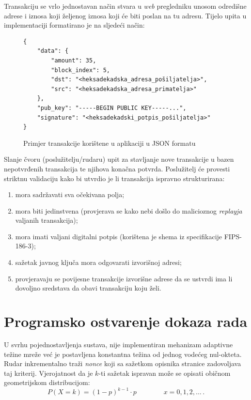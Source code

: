 \documentclass[utf8, zavrsni]{fer}
\begin{document}
Transakciju se vrlo jednostavan način stvara u \textit{web} pregledniku unosom odredišne adrese i iznosa koji željenog iznosa koji će biti poslan na tu adresu. Tijelo upita u implementaciji formatirano je na sljedeći način:
\begin{figure}[H]
\begin{verbatim}
{
	"data": {
		"amount": 35,
		"block_index": 5,
		"dst": "<heksadekadska_adresa_pošiljatelja>",
		"src": "<heksadekadska_adresa_primatelja>"
	},
	"pub_key": "-----BEGIN PUBLIC KEY-----...",
	"signature": "<heksadekadski_potpis_pošiljatelja>"
}
\end{verbatim}
\caption{Primjer transakcije korištene u aplikaciji u JSON formatu}
    \label{fig:img_txn}
\end{figure}

Slanje čvoru (poslužitelju/rudaru) upit za stavljanje nove transakcije u bazen nepotvrđenih transakcija te njihova konačna potvrda. Poslužitelj će provesti striktnu validaciju kako bi utvrdio je li transakcija ispravno strukturirana:

\begin{enumerate}
	\item mora sadržavati sva očekivana polja;
	\item mora biti jedinstvena (provjerava se kako nebi došlo do malicioznog \textit{replayja} valjanih transakcija);
	\item mora imati valjani digitalni potpis (korištena je shema iz specifikacije FIPS-186-3);
	\item sažetak javnog ključa mora odgovarati izvorišnoj adresi;
	\item provjeravaju se povijesne transakcije izvorišne adrese da se ustvrdi ima li dovoljno sredstava da obavi transakciju koju želi.
\end{enumerate}

\section{Programsko ostvarenje dokaza rada}
U svrhu pojednostavljenja sustava, nije implementiran mehanizam adaptivne težine mreže već je postavljena konstantna težina od jednog vodećeg nul-okteta. Rudar inkrementalno traži \textit{nonce} koji sa sažetkom opisnika stranice zadovoljava taj kriterij. Vjerojatnost da je $k$-ti sažetak ispravan može se opisati običnom geometrijskom distribucijom:
$$
P(X=k) = (1 - p) ^ {k-1} \cdot p \qquad \qquad x=0,1,2,\ldots \, .
$$
\end{document}
